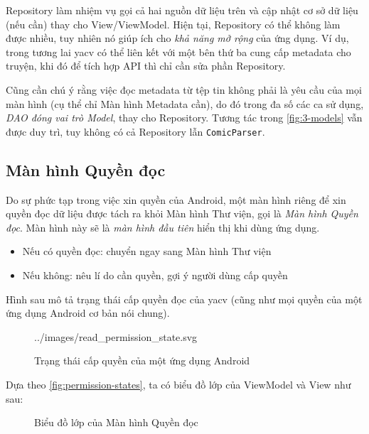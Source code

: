 \documentclass[../../../../thesis]{subfiles}
\begin{document}
Repository làm nhiệm vụ gọi cả hai nguồn dữ liệu trên và cập nhật cơ sở dữ liệu
(nếu cần) thay cho View/ViewModel. Hiện tại, Repository có thể không làm được
nhiều, tuy nhiên nó giúp ích cho \emph{khả năng mở rộng} của ứng dụng. Ví dụ,
trong tương lai yacv có thể liên kết với một bên thứ ba cung cấp metadata cho
truyện, khi đó để tích hợp API thì chỉ cần sửa phần Repository.

Cũng cần chú ý rằng việc đọc metadata từ tệp tin không phải là yêu cầu của mọi
màn hình (cụ thể chỉ Màn hình Metadata cần), do đó trong đa số các ca sử dụng,
\emph{DAO đóng vai trò Model}, thay cho Repository. Tương tác trong
\autoref{fig:3-models} vẫn được duy trì, tuy không có cả Repository lẫn
\texttt{ComicParser}.



\subsection{Màn hình Quyền đọc}\label{sec:permission-design}

Do sự phức tạp trong việc xin quyền của Android, một màn hình riêng để xin quyền
đọc dữ liệu được tách ra khỏi Màn hình Thư viện, gọi là \emph{Màn hình Quyền
đọc}. Màn hình này sẽ là \emph{màn hình đầu tiên} hiển thị khi dùng ứng dụng.

\begin{itemize}
    \item
        Nếu có quyền đọc: chuyển ngay sang Màn hình Thư viện
    \item
        Nếu không: nêu lí do cần quyền, gợi ý người dùng cấp quyền
\end{itemize}

Hình sau mô tả trạng thái cấp quyền đọc của yacv (cũng như mọi quyền của một ứng
dụng Android cơ bản nói chung).

\begin{figure}[H]
    \centering
    
        {../images/read_permission_state.svg}
    \caption{Trạng thái cấp quyền của một ứng dụng Android}
    \label{fig:permission-states}
\end{figure}

Dựa theo \autoref{fig:permission-states}, ta có biểu đồ lớp của ViewModel và
View như sau:

\begin{figure}[H]
    \centering
    
    \caption{Biểu đồ lớp của Màn hình Quyền đọc}
    \label{fig:read_permission_mvvm_class}
\end{figure}
\end{document}
